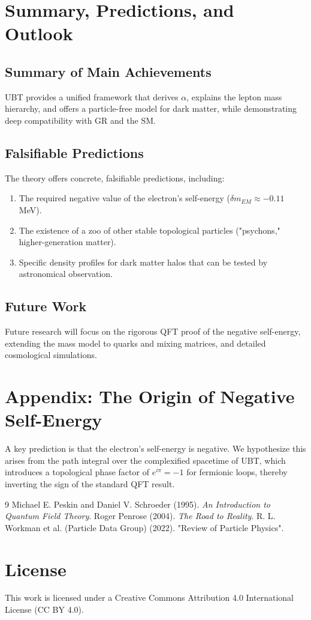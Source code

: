\documentclass[12pt, a4paper]{article}
\begin{document}
\section{Summary, Predictions, and Outlook}
\subsection{Summary of Main Achievements}
UBT provides a unified framework that derives \( \alpha \), explains the lepton mass hierarchy, and offers a particle-free model for dark matter, while demonstrating deep compatibility with GR and the SM.

\subsection{Falsifiable Predictions}
The theory offers concrete, falsifiable predictions, including:
\begin{enumerate}
    \item The required negative value of the electron's self-energy (\( \delta m_{EM} \approx -0.11 \) MeV).
    \item The existence of a zoo of other stable topological particles ("psychons," higher-generation matter).
    \item Specific density profiles for dark matter halos that can be tested by astronomical observation.
\end{enumerate}

\subsection{Future Work}
Future research will focus on the rigorous QFT proof of the negative self-energy, extending the mass model to quarks and mixing matrices, and detailed cosmological simulations.

\appendix
\section{Appendix: The Origin of Negative Self-Energy}
A key prediction is that the electron's self-energy is negative. We hypothesize this arises from the path integral over the complexified spacetime of UBT, which introduces a topological phase factor of \( e^{i\pi} = -1 \) for fermionic loops, thereby inverting the sign of the standard QFT result.


\begin{thebibliography}{9}
     Michael E. Peskin and Daniel V. Schroeder (1995). \textit{An Introduction to Quantum Field Theory}.
     Roger Penrose (2004). \textit{The Road to Reality}.
     R. L. Workman et al. (Particle Data Group) (2022). "Review of Particle Physics".
\end{thebibliography}

\section*{License}
This work is licensed under a Creative Commons Attribution 4.0 International License (CC BY 4.0).
\end{document}

